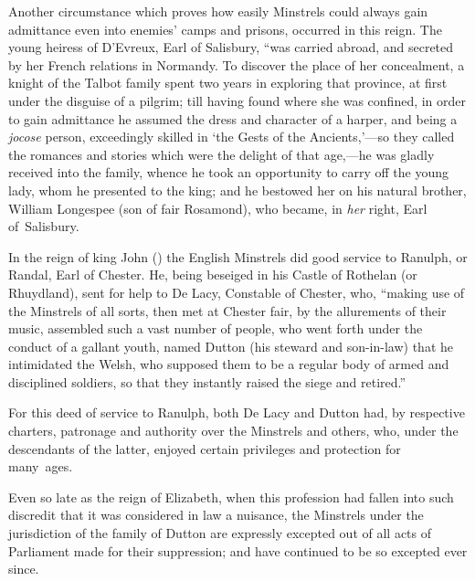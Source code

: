 Another circumstance which proves how easily Minstrels could always gain
admittance even into enemies’ camps and prisons, occurred in this reign. The
young heiress of D’Evreux, Earl of Salisbury, \pagebreak
“was carried abroad, and secreted
by her French relations in Normandy. To discover the place of her concealment, 
a knight of the Talbot family spent two years in exploring that province, at first
under the disguise of a pilgrim; till having found where she was confined, in
order to gain admittance he assumed the dress and character of a harper, and
being a \textit{jocose} person, exceedingly skilled in ‘the Gests of the Ancients,’—so they
called the romances and stories which were the delight of that age,—he was gladly
received into the family, whence he took an opportunity to carry off the young
lady, whom he presented to the king; and he bestowed her on his natural brother,
William Longespee (son of fair Rosamond), who became, in \textit{her} right, Earl of~Salisbury.

In the reign of king John () the English Minstrels did good service
to Ranulph, or Randal, Earl of Chester. He, being beseiged in his Castle of
Rothelan (or Rhuydland), sent for help to De Lacy, Constable of Chester, who,
“making use of the Minstrels of all sorts, then met at Chester fair, by the allurements
of their music, assembled such a vast number of people, who went forth
under the conduct of a gallant youth, named Dutton (his steward and son-in-law)
that he intimidated the Welsh, who supposed them to be a regular body of armed
and disciplined soldiers, so that they instantly raised the siege and retired.”

For this deed of service to Ranulph, both De Lacy and Dutton had, by
respective charters, patronage and authority over the Minstrels and others, who,
under the descendants of the latter, enjoyed certain privileges and protection for
many~ages.

Even so late as the reign of Elizabeth, when this profession had fallen into such
discredit that it was considered in law a nuisance, the Minstrels under the jurisdiction
of the family of Dutton are expressly excepted out of all acts of Parliament
made for their suppression; and have continued to be so excepted ever since. %

